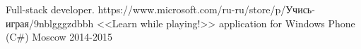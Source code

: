 \begin{cventries}

\cventry
{Full-stack developer. https://www.microsoft.com/ru-ru/store/p/Учись-играя/9nblgggzdbbh} %
{<<Learn while playing!>> application for Windows Phone  (C\#) } %
{Moscow} %
{2014-2015} %
{}
\end{cventries}